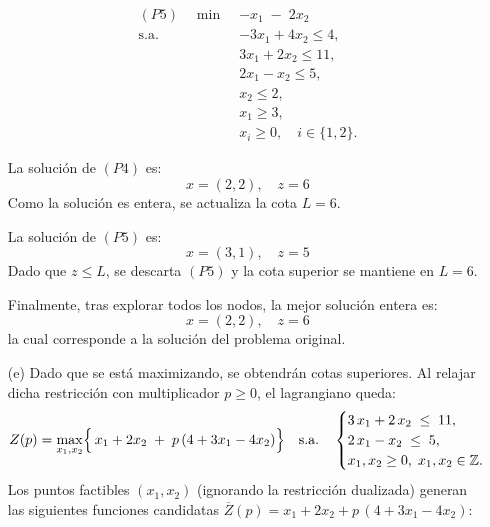 \begin{enumerate}
\begin{equation*}
\begin{aligned}
(P5)\quad \min\;& -x_1 \;-\; 2x_2\\
\text{s.a.}\;& -3x_{1} + 4x_{2} \le 4,\\
& 3x_{1} + 2x_{2} \le 11,\\
& 2x_{1} - x_{2} \le 5,\\
& x_{2} \le 2,\\
& x_{1} \ge 3,\\
& x_{i} \ge 0,\quad i\in\{1,2\}.
\end{aligned}
\end{equation*}

La solución de $(P4)$ es:
\begin{equation}
    x=(2,2), \quad z=6
\end{equation}
 Como la solución es entera, se actualiza la cota $L=6$.

 La solución de $(P5)$ es:
 \begin{equation}
     x=(3,1), \quad z= 5
 \end{equation}
 Dado que $z\le L$, se descarta $(P5)$ y la cota superior se mantiene en $L=6$.

 Finalmente, tras explorar todos los nodos, la mejor solución entera es:
 \begin{equation}
    x=(2,2), \quad z=6
\end{equation}
la cual corresponde a la solución del problema original.
  
  \item[(e)] Dado que se está maximizando, se obtendrán cotas superiores. Al relajar dicha restricción con multiplicador \(p\ge0\), el lagrangiano queda:
    \[
      Z(p)
      = \max_{x_{1},x_{2}}
      \Bigl\{\,x_{1} + 2x_{2}
      \;+\; p\,(4 + 3x_{1} - 4x_{2})\Bigr\}
      \quad\text{s.a.}\quad
      \begin{cases}
        3\,x_{1} + 2\,x_{2} \;\le\; 11,\\
        2\,x_{1} - x_{2} \;\le\; 5,\\
        x_{1},x_{2}\ge0,\;x_{1},x_{2}\in\mathbb{Z}.
      \end{cases}
    \]
    Los puntos factibles \((x_{1},x_{2})\) (ignorando la restricción dualizada) generan las siguientes funciones candidatas
    \(\displaystyle\overline{Z}(p)=x_{1}+2x_{2}+p\,(4+3x_{1}-4x_{2})\):


\end{enumerate}

